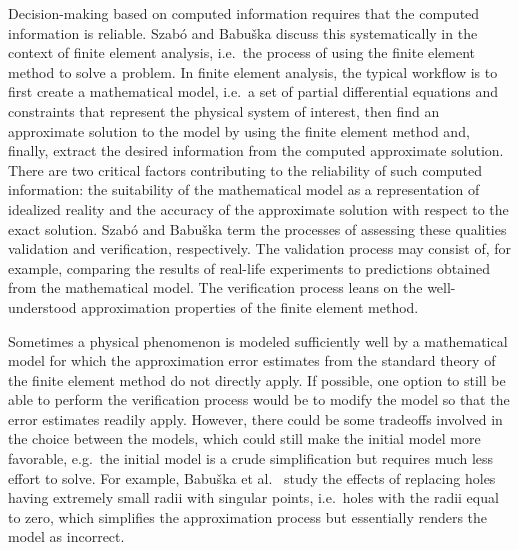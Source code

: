 \documentclass[english, 12pt, a4paper, sci, utf8, a-2b, online]{aaltothesis}
\theoremstyle{definition}
\theoremstyle{plain}
\numberwithin{equation}{section}
\begin{document}
Decision-making based on computed information requires that the computed
information is reliable. Szabó and Babu{\v s}ka \cite{szabobabuska2011}
discuss this systematically in the context of finite element analysis, i.e.\
the process of using the finite element method to solve a problem. In finite
element analysis, the typical workflow is to first create a mathematical model,
i.e.\ a set of partial differential equations and constraints
that represent the physical system of interest,
then find an approximate solution to the model by using the finite element method
and, finally, extract the desired information from the computed approximate solution.
There are two critical factors contributing to the reliability of such computed 
information: the suitability of the mathematical model as a representation of
idealized reality and the accuracy of the approximate solution with respect
to the exact solution.
Szabó and Babu{\v s}ka term the processes of assessing these qualities validation 
and verification, respectively.
The validation process may consist of, for example, comparing the results of
real-life experiments to predictions obtained from the mathematical model.
The verification process leans on the well-understood approximation
properties of the finite element method.

Sometimes a physical phenomenon is modeled sufficiently well by a 
mathematical model for which the approximation error estimates from the standard
theory of the finite element method do not directly apply.
If possible, one option to still be able to perform the verification process would 
be to modify the model so that the error estimates readily apply.
However, there could be some tradeoffs involved in the choice between the models,
which could still make the initial model more favorable,
e.g.\ the initial model is a crude simplification but requires much less
effort to solve. For example, Babu{\v s}ka et al.\ \cite{babuskasoanesuri2017}
study the effects of replacing holes having extremely small radii with singular
points, i.e.\ holes with the radii equal to zero, which simplifies the approximation process
but essentially renders the model as incorrect.
\end{document}
